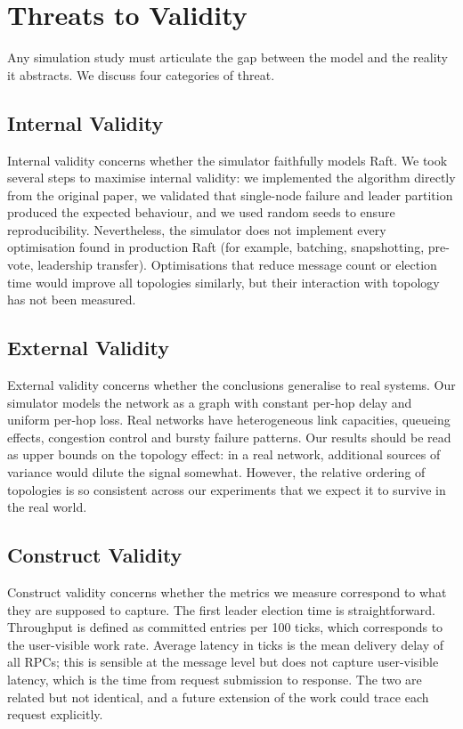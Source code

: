 \section{Threats to Validity}
\label{sec:limitations}

Any simulation study must articulate the gap between the model and the reality it abstracts. We discuss four categories of threat.

\subsection{Internal Validity}

Internal validity concerns whether the simulator faithfully models Raft. We took several steps to maximise internal validity: we implemented the algorithm directly from the original paper, we validated that single-node failure and leader partition produced the expected behaviour, and we used random seeds to ensure reproducibility. Nevertheless, the simulator does not implement every optimisation found in production Raft (for example, batching, snapshotting, pre-vote, leadership transfer). Optimisations that reduce message count or election time would improve all topologies similarly, but their interaction with topology has not been measured.

\subsection{External Validity}

External validity concerns whether the conclusions generalise to real systems. Our simulator models the network as a graph with constant per-hop delay and uniform per-hop loss. Real networks have heterogeneous link capacities, queueing effects, congestion control and bursty failure patterns. Our results should be read as upper bounds on the topology effect: in a real network, additional sources of variance would dilute the signal somewhat. However, the relative ordering of topologies is so consistent across our experiments that we expect it to survive in the real world.

\subsection{Construct Validity}

Construct validity concerns whether the metrics we measure correspond to what they are supposed to capture. The first leader election time is straightforward. Throughput is defined as committed entries per 100 ticks, which corresponds to the user-visible work rate. Average latency in ticks is the mean delivery delay of all RPCs; this is sensible at the message level but does not capture user-visible latency, which is the time from request submission to response. The two are related but not identical, and a future extension of the work could trace each request explicitly.


